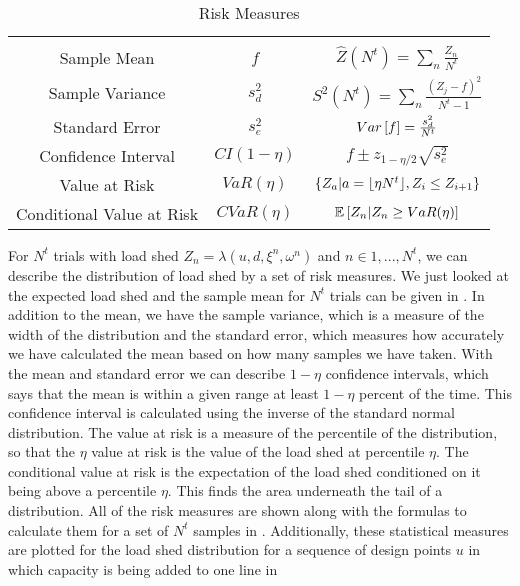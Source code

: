 \newcommand{\tabheight}{11pt}
\begin{table}
\centering
\begin{tabular}{| c | c | c|}
\hline
& & \\[1pt]
Sample Mean & $f$ &$ \hat{Z}(N^t)=\sum_n \frac{Z_n}{N^t} $\\[\tabheight]
Sample Variance & $s^2_d$ &$ S^2(N^t)=\sum_n \frac{\left(Z_j - f\right)^2}{N^t-1} $\\[\tabheight]
Standard Error & $s^2_e$ &$ Var\left[ f \right]= \frac{s^2_d}{N^t}$\\[\tabheight]
Confidence Interval& $CI(1-\eta)$  & $f \pm z_{1-\eta/2} \sqrt{s^2_e}$ \\[\tabheight]
Value at Risk & $ VaR(\eta)$& $ \left\{ Z_{a} |  a = \lfloor  \eta N^t  \rfloor, Z_i \leq Z_{i+1}\right\} $\\[\tabheight]  %
Conditional Value at Risk & $ CVaR(\eta)$& $\mathbb{E}\left[ Z_n | Z_n \geq VaR(\eta) \right]$ \\[\tabheight]
\hline
\end{tabular}
\caption{Risk Measures}\label{tab:risk}
\end{table}

For $N^t$ trials with load shed $Z_n = \lambda (u,d,\xi^n,\omega^n )$ and $n \in 1,...,N^t$, we can describe the distribution of load shed by a set of risk measures.  We just looked at the expected load shed and the sample mean for $N^t$ trials can be given in .  In addition to the mean, we have the sample variance, which is a measure of the width of the distribution and the standard error, which measures how accurately we have calculated the mean based on how many samples we have taken.  With the mean and standard error we can describe $1-\eta$ confidence intervals, which says that the mean is within a given range at least $1-\eta$ percent of the time.  This confidence interval is calculated using the inverse of the standard normal distribution.  The value at risk is a measure of the percentile of the distribution, so that the $\eta$ value at risk is the value of the load shed at percentile $\eta$.  The conditional value at risk is the expectation of the load shed conditioned on it being above a percentile $\eta$.  This finds the area underneath the tail of a distribution.  All of the risk measures are shown along with the formulas to calculate them for a set of $N^t$ samples in .  Additionally, these statistical measures are plotted for the load shed distribution for a sequence of design points $u$ in which capacity is being added to one line in 

